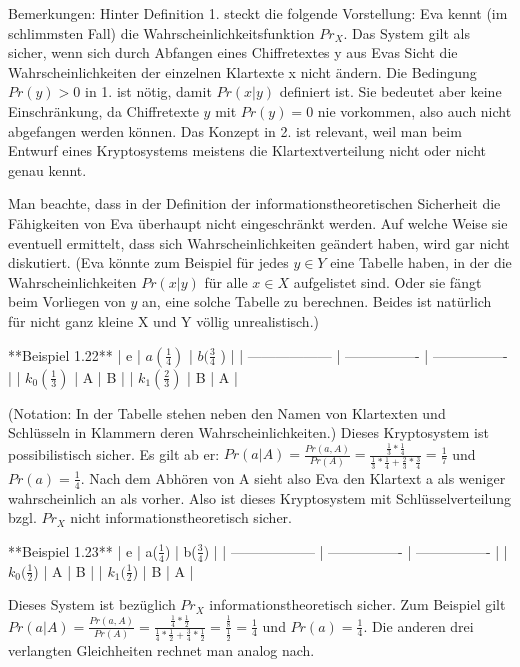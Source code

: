 \documentclass[a4paper]{article}
\begin{document}
\begin{multicols}{3}
    Bemerkungen: Hinter Definition 1. steckt die folgende Vorstellung: Eva kennt (im schlimmsten Fall) die Wahrscheinlichkeitsfunktion $Pr_X$. Das System gilt als sicher, wenn sich durch Abfangen eines Chiffretextes y aus Evas Sicht die Wahrscheinlichkeiten der einzelnen Klartexte x nicht ändern. Die Bedingung $Pr(y)>0$ in 1. ist nötig, damit $Pr(x|y)$ definiert ist. Sie bedeutet aber keine Einschränkung, da Chiffretexte $y$ mit $Pr(y)=0$ nie vorkommen, also auch nicht abgefangen werden können. Das Konzept in 2. ist relevant, weil man beim Entwurf eines Kryptosystems meistens die Klartextverteilung nicht oder nicht genau kennt.

    Man beachte, dass in der Definition der informationstheoretischen Sicherheit die Fähigkeiten von Eva überhaupt nicht eingeschränkt werden. Auf welche Weise sie eventuell ermittelt, dass sich Wahrscheinlichkeiten geändert haben, wird gar nicht diskutiert. (Eva könnte zum Beispiel für jedes $y\in Y$ eine Tabelle haben, in der die Wahrscheinlichkeiten $Pr(x|y)$ für alle $x\in X$ aufgelistet sind. Oder sie fängt beim Vorliegen von $y$ an, eine solche Tabelle zu berechnen. Beides ist natürlich für nicht ganz kleine X und Y völlig unrealistisch.)

    **Beispiel 1.22**
    | e                  | $a(\frac{1}{4})$ | $b(\frac{3}{4}$ ) |
    | ------------------ | ---------------- | ---------------- |
    | $k_0(\frac{1}{3})$ | A                | B                |
    | $k_1(\frac{2}{3})$ | B                | A                |

    (Notation: In der Tabelle stehen neben den Namen von Klartexten und Schlüsseln in Klammern deren Wahrscheinlichkeiten.) Dieses Kryptosystem ist possibilistisch sicher. Es gilt ab er:
    $Pr(a|A)=\frac{Pr(a,A)}{Pr(A)}=\frac{\frac{1}{3}*\frac{1}{4}}{\frac{1}{3}*\frac{1}{4}+\frac{2}{3}*\frac{3}{4}}=\frac{1}{7}$ und $Pr(a)=\frac{1}{4}$.
    Nach dem Abhören von A sieht also Eva den Klartext a als weniger wahrscheinlich an als vorher. Also ist dieses Kryptosystem mit Schlüsselverteilung bzgl. $Pr_X$ nicht informationstheoretisch sicher.

    **Beispiel 1.23**
    | e                  | a($\frac{1}{4}$) | b($\frac{3}{4}$) |
    | ------------------ | ---------------- | ---------------- |
    | $k_0(\frac{1}{2}$) | A                | B                |
    | $k_1(\frac{1}{2}$) | B                | A                |

    Dieses System ist bezüglich $Pr_X$ informationstheoretisch sicher. Zum Beispiel gilt $Pr(a|A) =\frac{Pr(a,A)}{Pr(A)}=\frac{\frac{1}{4}*\frac{1}{2}}{\frac{1}{4}*\frac{1}{2}+\frac{3}{4}*\frac{1}{2}}=\frac{\frac{1}{8}}{\frac{1}{2}}=\frac{1}{4}$ und $Pr(a)=\frac{1}{4}$. Die anderen drei verlangten Gleichheiten rechnet man analog nach.


\end{multicols}
\end{document}
